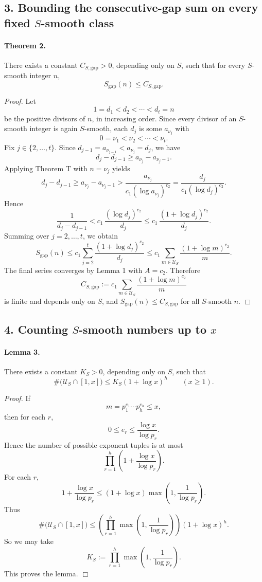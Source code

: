 \subsection*{3. Bounding the consecutive-gap sum on every fixed \(S\)-smooth class}

\paragraph{Theorem 2.}
There exists a constant \(C_{S,\mathrm{gap}}>0\), depending only on \(S\), such that for every \(S\)-smooth integer \(n\),
\[
S_{\mathrm{gap}}(n)\le C_{S,\mathrm{gap}}.
\]

\emph{Proof.}
Let
\[
1=d_1<d_2<\cdots<d_t=n
\]
be the positive divisors of \(n\), in increasing order. Since every divisor of an \(S\)-smooth integer is again \(S\)-smooth, each \(d_j\) is some \(a_{\nu_j}\) with
\[
0=\nu_1<\nu_2<\cdots<\nu_t.
\]
Fix \(j\in\{2,\dots,t\}\). Since \(d_{j-1}=a_{\nu_{j-1}}<a_{\nu_j}=d_j\), we have
\[
d_j-d_{j-1}\ge a_{\nu_j}-a_{\nu_j-1}.
\]
Applying Theorem T with \(n=\nu_j\) yields
\[
d_j-d_{j-1}\ge a_{\nu_j}-a_{\nu_j-1}
> \frac{a_{\nu_j}}{c_1(\log a_{\nu_j})^{c_2}}
= \frac{d_j}{c_1(\log d_j)^{c_2}}.
\]
Hence
\[
\frac{1}{d_j-d_{j-1}} < c_1\,\frac{(\log d_j)^{c_2}}{d_j}
\le c_1\,\frac{(1+\log d_j)^{c_2}}{d_j}.
\]
Summing over \(j=2,\dots,t\), we obtain
\[
S_{\mathrm{gap}}(n)
\le c_1\sum_{j=2}^{t}\frac{(1+\log d_j)^{c_2}}{d_j}
\le c_1\sum_{m\in \mathcal U_S}\frac{(1+\log m)^{c_2}}{m}.
\]
The final series converges by Lemma 1 with \(A=c_2\). Therefore
\[
C_{S,\mathrm{gap}}
:=
c_1\sum_{m\in \mathcal U_S}\frac{(1+\log m)^{c_2}}{m}
\]
is finite and depends only on \(S\), and \(S_{\mathrm{gap}}(n)\le C_{S,\mathrm{gap}}\) for all \(S\)-smooth \(n\).
\hfill\(\Box\)

\subsection*{4. Counting \(S\)-smooth numbers up to \(x\)}

\paragraph{Lemma 3.}
There exists a constant \(K_S>0\), depending only on \(S\), such that
\[
\#\bigl(\mathcal U_S\cap [1,x]\bigr)\le K_S(1+\log x)^h
\qquad (x\ge 1).
\]

\emph{Proof.}
If
\[
m=p_1^{e_1}\cdots p_h^{e_h}\le x,
\]
then for each \(r\),
\[
0\le e_r\le \frac{\log x}{\log p_r}.
\]
Hence the number of possible exponent tuples is at most
\[
\prod_{r=1}^h\left(1+\frac{\log x}{\log p_r}\right).
\]
For each \(r\),
\[
1+\frac{\log x}{\log p_r}\le (1+\log x)\max\left(1,\frac{1}{\log p_r}\right).
\]
Thus
\[
\#\bigl(\mathcal U_S\cap [1,x]\bigr)
\le
\left(\prod_{r=1}^h \max\left(1,\frac{1}{\log p_r}\right)\right)(1+\log x)^h.
\]
So we may take
\[
K_S:=\prod_{r=1}^h \max\left(1,\frac{1}{\log p_r}\right).
\]
This proves the lemma.
\hfill\(\Box\)


